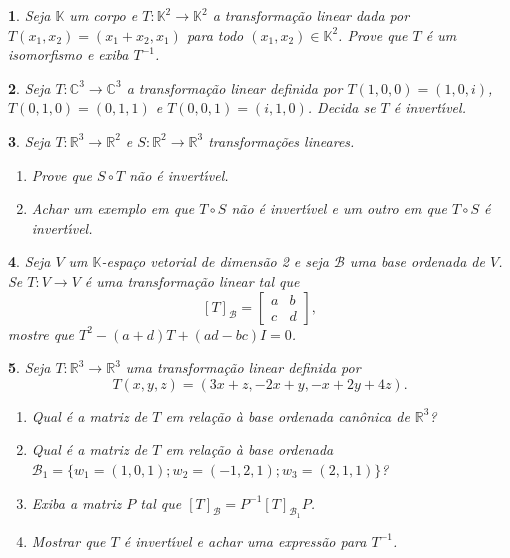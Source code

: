 \documentclass[12pt]{exam}
\newtheorem{exercicio}{}
\newcommand{\real}{\mathbb{R}}
\newcommand{\complex}{\mathbb{C}}
\newcommand{\cp}[1]{\mathbb{#1}}
\begin{document}
\begin{exercicio}
  Seja $\cp{K}$ um corpo e $T : \cp{K}^2 \to \cp{K}^2$ a transforma\c{c}\~ao linear dada por $T(x_1,x_2) = (x_1 + x_2, x_1)$ para todo $(x_1,x_2) \in \cp{K}^2$. Prove que $T$ \'e um isomorfismo e exiba $T^{-1}$.
\end{exercicio}

\begin{exercicio}
  Seja $T : \complex^3 \to \complex^3$ a transforma\c{c}\~ao linear definida por $T(1,0,0) = (1,0,i)$, $T(0,1,0) = (0,1,1)$ e $T(0,0,1) = (i,1,0)$. Decida se $T$ \'e invert{\'\i}vel.
\end{exercicio}

\begin{exercicio}
  Seja $T : \real^3 \to \real^2$ e $S : \real^2 \to \real^3$ transforma\c{c}\~oes lineares.
  \begin{enumerate}[label=({\alph*})]
    \item Prove que $S \circ T$ n\~ao \'e invert{\'\i}vel.
    \item Achar um exemplo em que $T\circ S$ n\~ao \'e invert{\'\i}vel e um outro em que $T\circ S$ \'e invert{\'\i}vel.
  \end{enumerate}
\end{exercicio}

\begin{exercicio}
  Seja $V$ um $\cp{K}$-espa\c{c}o vetorial de dimens\~ao 2 e seja $\mathcal{B}$ uma base ordenada de $V$. Se $T: V \to V$ \'e uma transforma\c{c}\~ao linear tal que
  \[
    [T]_\mathcal{B} = \begin{bmatrix}
      a & b\\
      c & d
    \end{bmatrix},
  \]
  mostre que $T^2 - (a + d)T + (ad - bc)I = 0$.
\end{exercicio}

\begin{exercicio}
  Seja $T : \real^3 \to \real^3$ uma transforma\c{c}\~ao linear definida por
  \[
    T(x,y,z) = (3x + z,-2x + y,-x+2y + 4z).
  \]
  \begin{enumerate}[label=({\alph*})]
    \item Qual \'e a matriz de $T$ em rela\c{c}\~ao \`a base ordenada can\^onica de $\real^3$?
    \item Qual \'e a matriz de $T$ em rela\c{c}\~ao \`a base ordenada $\mathcal{B}_1 = \{w_1 = (1,0,1); w_2 = (-1,2,1); w_3 = (2,1,1)\}$?
    \item Exiba a matriz $P$ tal que $[T]_{\mathcal{B}} = P^{-1}[T]_{\mathcal{B}_1}P$.
    \item Mostrar que $T$ \'e invert{\'\i}vel e achar uma express\~ao para $T^{-1}$.
  \end{enumerate}
\end{exercicio}
\end{document}
